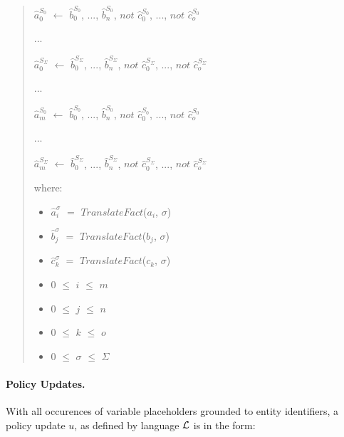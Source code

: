 \documentclass[10pt, twocolumn]{article}
\begin{document}
           \begin{quote}
            $\hat{a}^{S_{0}}_{0}$ $\leftarrow$
            $\hat{b}^{S_{0}}_{0}$, ..., $\hat{b}^{S_{0}}_{n}$,
            $not$ $\hat{c}^{S_{0}}_{0}$, ..., $not$ $\hat{c}^{S_{0}}_{o}$

            ...

            $\hat{a}^{S_{\Sigma}}_{0}$ $\leftarrow$
            $\hat{b}^{S_{\Sigma}}_{0}$, ..., $\hat{b}^{S_{\Sigma}}_{n}$,
            $not$ $\hat{c}^{S_{\Sigma}}_{0}$, ..., $not$ $\hat{c}^{S_{\Sigma}}_{o}$

            ...

            $\hat{a}^{S_{0}}_{m}$ $\leftarrow$
            $\hat{b}^{S_{0}}_{0}$, ..., $\hat{b}^{S_{0}}_{n}$,
            $not$ $\hat{c}^{S_{0}}_{0}$, ..., $not$ $\hat{c}^{S_{0}}_{o}$

            ...

            $\hat{a}^{S_{\Sigma}}_{m}$ $\leftarrow$
            $\hat{b}^{S_{\Sigma}}_{0}$, ..., $\hat{b}^{S_{\Sigma}}_{n}$,
            $not$ $\hat{c}^{S_{\Sigma}}_{0}$, ..., $not$ $\hat{c}^{S_{\Sigma}}_{o}$

            where:

            \begin{itemize}
              \item
                $\hat{a}^{\sigma}_{i}$ $=$ $TranslateFact$($a_{i}$, $\sigma$)
              \item
                $\hat{b}^{\sigma}_{j}$ $=$ $TranslateFact$($b_{j}$, $\sigma$)
              \item
                $\hat{c}^{\sigma}_{k}$ $=$ $TranslateFact$($c_{k}$, $\sigma$)
              \item
                $0$ $\leq$ $i$ $\leq$ $m$
              \item
                $0$ $\leq$ $j$ $\leq$ $n$
              \item
                $0$ $\leq$ $k$ $\leq$ $o$
              \item
                $0$ $\leq$ $\sigma$ $\leq$ $\Sigma$
            \end{itemize}
          \end{quote}      

        \paragraph{Policy Updates.}

          With all occurences of variable placeholders grounded to entity
          identifiers, a policy update $u$, as defined by language ${\cal L}$
          is in the form:
\end{document}
